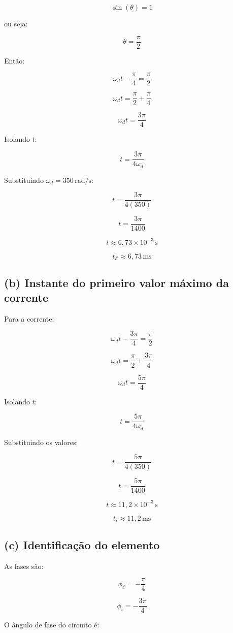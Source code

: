 \documentclass[12pt,a4paper]{article}
\begin{document}
\[
\sin(\theta)=1
\]

ou seja:

\[
\theta = \frac{\pi}{2}
\]

Então:

\[
\omega_d t - \frac{\pi}{4} = \frac{\pi}{2}
\]

\[
\omega_d t = \frac{\pi}{2}+\frac{\pi}{4}
\]

\[
\omega_d t = \frac{3\pi}{4}
\]

Isolando $t$:

\[
t=\frac{3\pi}{4\omega_d}
\]

Substituindo $\omega_d = 350\,\text{rad/s}$:

\[
t=\frac{3\pi}{4(350)}
\]

\[
t=\frac{3\pi}{1400}
\]

\[
t\approx 6,73\times10^{-3}\,\text{s}
\]

\[
\boxed{t_{\mathcal{E}} \approx 6,73\,\text{ms}}
\]



\subsection*{(b) Instante do primeiro valor máximo da corrente}

Para a corrente:

\[
\omega_d t - \frac{3\pi}{4} = \frac{\pi}{2}
\]

\[
\omega_d t = \frac{\pi}{2}+\frac{3\pi}{4}
\]

\[
\omega_d t = \frac{5\pi}{4}
\]

Isolando $t$:

\[
t=\frac{5\pi}{4\omega_d}
\]

Substituindo os valores:

\[
t=\frac{5\pi}{4(350)}
\]

\[
t=\frac{5\pi}{1400}
\]

\[
t\approx 11,2\times10^{-3}\,\text{s}
\]

\[
\boxed{t_i \approx 11,2\,\text{ms}}
\]


\subsection*{(c) Identificação do elemento}

As fases são:

\[
\phi_{\mathcal{E}}=-\frac{\pi}{4}
\]

\[
\phi_i=-\frac{3\pi}{4}
\]

O ângulo de fase do circuito é:
\end{document}
